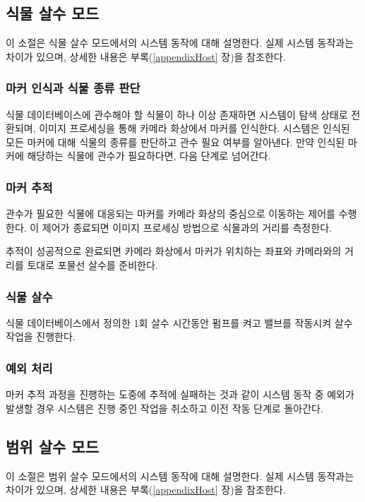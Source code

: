 \documentclass[chapter,11pt,oneside,openany]{xoblivoir}
\begin{document}
\subsection{식물 살수 모드}
\label{routinePlant}

이 소절은 식물 살수 모드에서의 시스템 동작에 대해 설명한다.
실제 시스템 동작과는 차이가 있으며, 상세한 내용은 부록(\ref{appendixHost} 장)을 참조한다.

\subsubsection{마커 인식과 식물 종류 판단}
식물 데이터베이스에 관수해야 할 식물이 하나 이상 존재하면 시스템이 탐색 상태로 전환되며,
이미지 프로세싱을 통해 카메라 화상에서 마커를 인식한다.
시스템은 인식된 모든 마커에 대해 식물의 종류를 판단하고 관수 필요 여부를 알아낸다.
만약 인식된 마커에 해당하는 식물에 관수가 필요하다면, 다음 단계로 넘어간다.

\subsubsection{마커 추적}
관수가 필요한 식물에 대응되는 마커를 카메라 화상의 중심으로 이동하는 제어를 수행한다.
이 제어가 종료되면 이미지 프로세싱 방법으로 식물과의 거리를 측정한다.

추적이 성공적으로 완료되면 카메라 화상에서 마커가 위치하는 좌표와
카메라와의 거리를 토대로 포물선 살수를 준비한다.

\subsubsection{식물 살수}
식물 데이터베이스에서 정의한 1회 살수 시간동안 펌프를 켜고 밸브를 작동시켜
살수 작업을 진행한다.

\subsubsection{예외 처리}
마커 추적 과정을 진행하는 도중에 추적에 실패하는 것과 같이 시스템 동작 중
예외가 발생할 경우 시스템은 진행 중인 작업을 취소하고 이전 작동 단계로 돌아간다.


\subsection{범위 살수 모드}
\label{routineRange}

이 소절은 범위 살수 모드에서의 시스템 동작에 대해 설명한다.
실제 시스템 동작과는 차이가 있으며, 상세한 내용은 부록(\ref{appendixHost} 장)을 참조한다.
\end{document}
